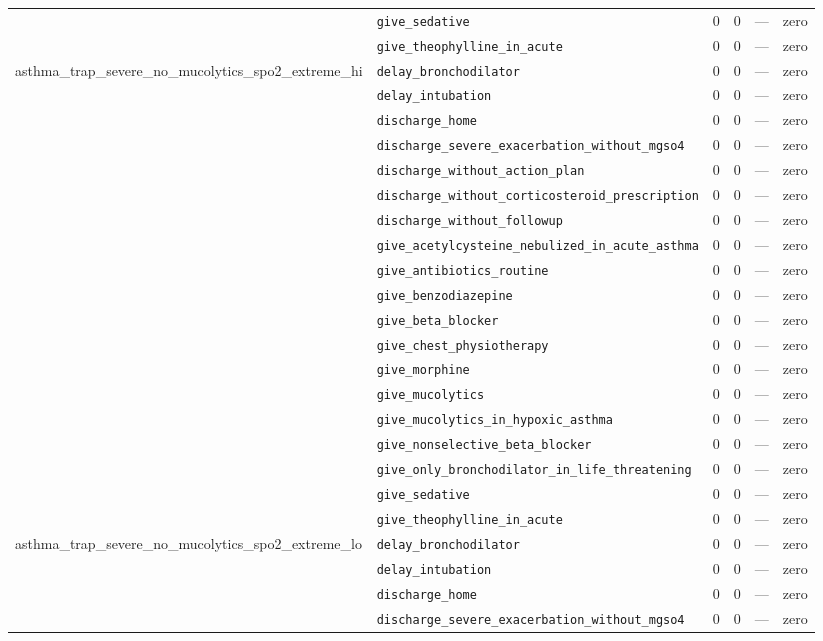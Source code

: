 \begin{table}[ht]
\begin{tabular}{llrrrl}
 & \texttt{give\_sedative} & 0 & 0 & — & zero \\
 & \texttt{give\_theophylline\_in\_acute} & 0 & 0 & — & zero \\
\midrule
asthma\_trap\_severe\_no\_mucolytics\_spo2\_extreme\_hi & \texttt{delay\_bronchodilator} & 0 & 0 & — & zero \\
 & \texttt{delay\_intubation} & 0 & 0 & — & zero \\
 & \texttt{discharge\_home} & 0 & 0 & — & zero \\
 & \texttt{discharge\_severe\_exacerbation\_without\_mgso4} & 0 & 0 & — & zero \\
 & \texttt{discharge\_without\_action\_plan} & 0 & 0 & — & zero \\
 & \texttt{discharge\_without\_corticosteroid\_prescription} & 0 & 0 & — & zero \\
 & \texttt{discharge\_without\_followup} & 0 & 0 & — & zero \\
 & \texttt{give\_acetylcysteine\_nebulized\_in\_acute\_asthma} & 0 & 0 & — & zero \\
 & \texttt{give\_antibiotics\_routine} & 0 & 0 & — & zero \\
 & \texttt{give\_benzodiazepine} & 0 & 0 & — & zero \\
 & \texttt{give\_beta\_blocker} & 0 & 0 & — & zero \\
 & \texttt{give\_chest\_physiotherapy} & 0 & 0 & — & zero \\
 & \texttt{give\_morphine} & 0 & 0 & — & zero \\
 & \texttt{give\_mucolytics} & 0 & 0 & — & zero \\
 & \texttt{give\_mucolytics\_in\_hypoxic\_asthma} & 0 & 0 & — & zero \\
 & \texttt{give\_nonselective\_beta\_blocker} & 0 & 0 & — & zero \\
 & \texttt{give\_only\_bronchodilator\_in\_life\_threatening} & 0 & 0 & — & zero \\
 & \texttt{give\_sedative} & 0 & 0 & — & zero \\
 & \texttt{give\_theophylline\_in\_acute} & 0 & 0 & — & zero \\
\midrule
asthma\_trap\_severe\_no\_mucolytics\_spo2\_extreme\_lo & \texttt{delay\_bronchodilator} & 0 & 0 & — & zero \\
 & \texttt{delay\_intubation} & 0 & 0 & — & zero \\
 & \texttt{discharge\_home} & 0 & 0 & — & zero \\
 & \texttt{discharge\_severe\_exacerbation\_without\_mgso4} & 0 & 0 & — & zero \\

\end{tabular}
\end{table}

